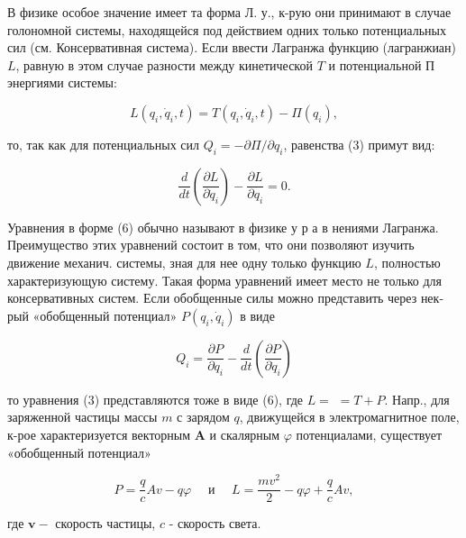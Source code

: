 \documentclass[10pt]{article}
\begin{document}
В физике особое значение имеет та форма Л. у., к-рую они принимают в случае голономной системы, находящейся под действием одних только потенциальных сил (см. Консервативная система). Если ввести Лагранжа функцию (лагранжиан) $L$, равную в этом случае разности между кинетической $T$ и потенциальной $П$ энергиями системы:



\[

L\left(q_{i}, \dot{q}_{i}, t\right)=T\left(q_{i}, \dot{q}_{i}, t\right)-\Pi\left(q_{i}\right),

\]



то, так как для потенциальных сил $Q_{i}=-\partial \Pi / \partial q_{i}$, равенства (3) примут вид:



\[

\frac{d}{d t}\left(\frac{\partial L}{\partial \dot{q}_{i}}\right)-\frac{\partial L}{\partial q_{i}}=0 .

\]



Уравнения в форме (6) обычно называют в физике у р а в нениями Лагранжа. Преимущество этих уравнений состоит в том, что они позволяют изучить движение механич. системы, зная для нее одну только функцию $L$, полностью характеризующую систему. Такая форма уравнений имеет место не только для консервативных систем. Если обобщенные силы можно представить через нек-рый «обобщенный потенциал» $P\left(q_{i}, \dot{q}_{i}\right)$ в виде



\[

Q_{i}=\frac{\partial P}{\partial q_{i}}-\frac{d}{d t}\left(\frac{\partial P}{\partial \dot{q}_{i}}\right)

\]



то уравнения (3) представляются тоже в виде (6), где $L=$ $=T+P$. Напр., для заряженной частицы массы $m$ с зарядом $q$, движущейся в электромагнитное поле, к-рое характеризуется векторным $\boldsymbol{A}$ и скалярным $\varphi$ потенциалами, существует «обобщенный потенциал»



\[

P=\frac{q}{c} A v-q \varphi \quad \text { и } \quad L=\frac{m v^{2}}{2}-q \varphi+\frac{q}{c} A v,

\]



где $\boldsymbol{v}-$ скорость частицы, $c$ - скорость света.
\end{document}
